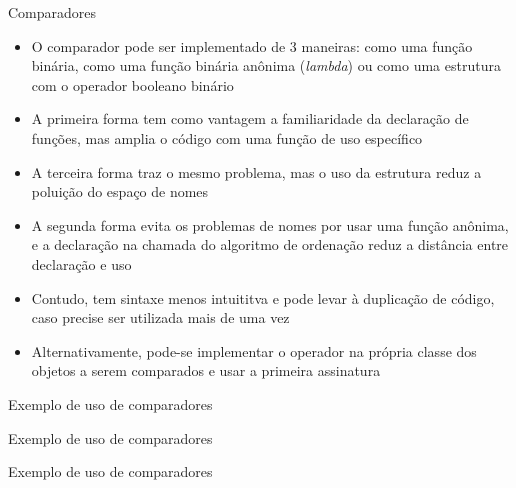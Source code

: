 \begin{frame}[fragile]{Comparadores}

    \begin{itemize}
        \item O comparador pode ser implementado de 3 maneiras: como uma função binária,
            como uma função binária anônima (\textit{lambda}) ou como uma estrutura com
            o operador booleano binário 

        \item A primeira forma tem como vantagem a familiaridade da declaração de funções,
            mas amplia o código com uma função de uso específico

        \item A terceira forma traz o mesmo problema, mas o uso da estrutura 
            reduz a poluição do espaço de nomes

        \item A segunda forma evita os problemas de nomes por usar uma função anônima, e a
            declaração na chamada do algoritmo de ordenação reduz a distância entre declaração e uso

        \item Contudo, tem sintaxe menos intuititva e pode levar à duplicação de código, caso
            precise ser utilizada mais de uma vez
        
        \item Alternativamente, pode-se implementar o operador  na própria 
            classe dos objetos a serem comparados e usar a primeira assinatura
    \end{itemize}

\end{frame}

\begin{frame}[fragile]{Exemplo de uso de comparadores}
\end{frame}

\begin{frame}[fragile]{Exemplo de uso de comparadores}
\end{frame}

\begin{frame}[fragile]{Exemplo de uso de comparadores}
\end{frame}

